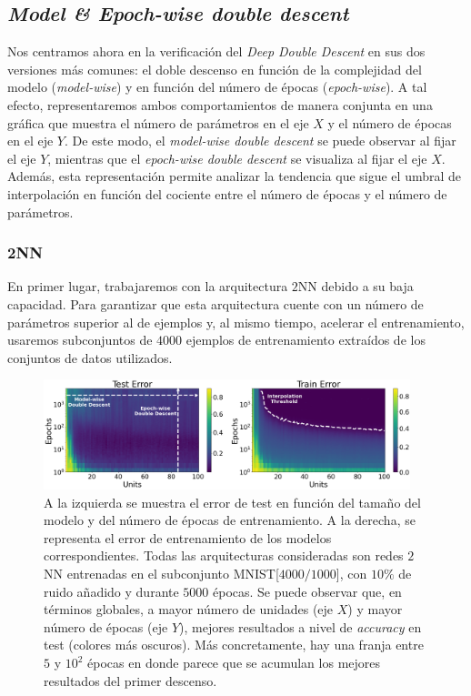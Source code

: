\subsection{\textit{Model \& Epoch-wise double descent}}\label{subsec:model-epoch-wise}

Nos centramos ahora en la verificación del \textit{Deep Double Descent} en sus dos versiones más comunes: el doble descenso en función de la complejidad del modelo (\textit{model-wise}) y en función del número de épocas (\textit{epoch-wise}). A tal efecto, representaremos ambos comportamientos de manera conjunta en una gráfica que muestra el número de parámetros en el eje $X$ y el número de épocas en el eje $Y$. De este modo, el \textit{model-wise double descent} se puede observar al fijar el eje $Y$, mientras que el \textit{epoch-wise double descent} se visualiza al fijar el eje $X$. Además, esta representación permite analizar la tendencia que sigue el umbral de interpolación en función del cociente entre el número de épocas y el número de parámetros.

\subsubsection{2NN}\label{subsubsec:model-epoch-wise-2NN}

En primer lugar, trabajaremos con la arquitectura $2$NN debido a su baja capacidad. Para garantizar que esta arquitectura cuente con un número de parámetros superior al de ejemplos y, al mismo tiempo, acelerar el entrenamiento, usaremos subconjuntos de $4000$ ejemplos de entrenamiento extraídos de los conjuntos de datos utilizados.

\begin{figure}[h]
    \centering
    \includegraphics[width=0.95\textwidth]{img/experiments/model-epoch2NNMNIST.png}
    \caption[Doble descenso en función del tamaño del modelo y del número de épocas para la red $2$NN y un subconjunto de MNIST.]{A la izquierda se muestra el error de test en función del tamaño del modelo y del número de épocas de entrenamiento. A la derecha, se representa el error de entrenamiento de los modelos correspondientes. Todas las arquitecturas consideradas son redes $2$NN entrenadas en el subconjunto MNIST[$4000/1000$], con $10\%$ de ruido añadido y durante $5000$ épocas. Se puede observar que, en términos globales, a mayor número de unidades (eje $X$) y mayor número de épocas (eje $Y$), mejores resultados a nivel de \textit{accuracy} en test (colores más oscuros). Más concretamente, hay una franja entre $5$ y $10^2$ épocas en donde parece que se acumulan los mejores resultados del primer descenso.}\label{fig:model-epoch2NNMNIST}
\end{figure}

